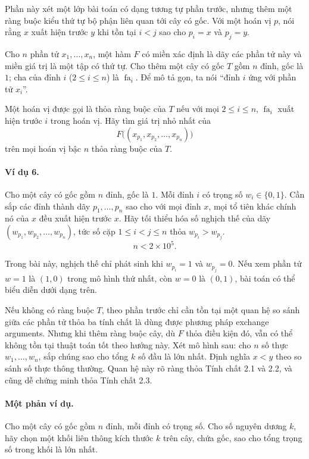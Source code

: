\documentclass[11pt]{article}
\begin{document}
Phần này xét một lớp bài toán có dạng tương tự phần trước, nhưng thêm một ràng
buộc kiểu thứ tự bộ phận liên quan tới cây có gốc. Với một hoán vị $p$, nói
rằng $x$ xuất hiện trước $y$ khi tồn tại $i<j$ sao cho $p_i=x$ và $p_j=y$.

Cho $n$ phần tử $x_1,\ldots,x_n$, một hàm $F$ có miền xác định là dãy các phần
tử này và miền giá trị là một tập có thứ tự. Cho thêm một cây có gốc $T$ gồm
$n$ đỉnh, gốc là $1$; cha của đỉnh $i$ ($2\le i\le n$) là $\operatorname{fa}_i$.
Để mô tả gọn, ta nói ``đỉnh $i$ ứng với phần tử $x_i$''.

Một hoán vị được gọi là thỏa ràng buộc của $T$ nếu với mọi $2\le i\le n$,
$\operatorname{fa}_i$ xuất hiện trước $i$ trong hoán vị. Hãy tìm giá trị nhỏ
nhất của
\[
  F\bigl((x_{p_1},x_{p_2},\ldots,x_{p_n})\bigr)
\]
trên mọi hoán vị bậc $n$ thỏa ràng buộc của $T$.

\paragraph{Ví dụ 6.}
Cho một cây có gốc gồm $n$ đỉnh, gốc là $1$. Mỗi đỉnh $i$ có trọng số
$w_i\in\{0,1\}$. Cần sắp các đỉnh thành dãy $p_1,\ldots,p_n$ sao cho với mọi
đỉnh $x$, mọi tổ tiên khác chính nó của $x$ đều xuất hiện trước $x$. Hãy tối
thiểu hóa số nghịch thế của dãy $(w_{p_1},w_{p_2},\ldots,w_{p_n})$, tức số cặp
$1\le i<j\le n$ thỏa $w_{p_i}>w_{p_j}$.
\[
  n<2\times 10^5.
\]

Trong bài này, nghịch thế chỉ phát sinh khi $w_{p_i}=1$ và $w_{p_j}=0$. Nếu xem
phần tử $w=1$ là $(1,0)$ trong mô hình thứ nhất, còn $w=0$ là $(0,1)$, bài toán
có thể biểu diễn dưới dạng trên.

Nếu không có ràng buộc $T$, theo phần trước chỉ cần tồn tại một quan hệ so sánh
giữa các phần tử thỏa ba tính chất là dùng được phương pháp exchange arguments.
Nhưng khi thêm ràng buộc cây, dù $F$ thỏa điều kiện đó, vẫn có thể không tồn tại
thuật toán tốt theo hướng này. Xét mô hình sau: cho $n$ số thực
$w_1,\ldots,w_n$, sắp chúng sao cho tổng $k$ số đầu là lớn nhất. Định nghĩa
$x<y$ theo so sánh số thực thông thường. Quan hệ này rõ ràng thỏa Tính chất
2.1 và 2.2, và cũng dễ chứng minh thỏa Tính chất 2.3.

\paragraph{Một phản ví dụ.}
Cho một cây có gốc gồm $n$ đỉnh, mỗi đỉnh có trọng số. Cho số nguyên dương $k$,
hãy chọn một khối liên thông kích thước $k$ trên cây, chứa gốc, sao cho tổng
trọng số trong khối là lớn nhất.
\end{document}
